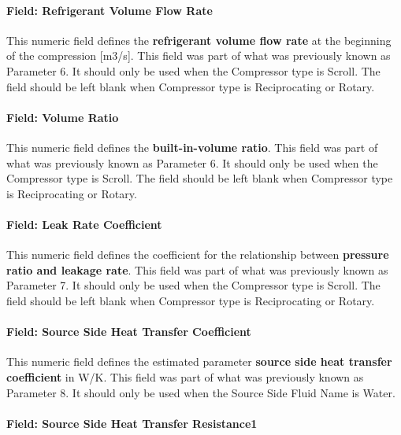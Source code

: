 \paragraph{Field: Refrigerant Volume Flow Rate}\label{field-refrigerant-volume-flow-rate-1}

This numeric field defines the \textbf{refrigerant volume flow rate} at the beginning of the compression {[}m3/s{]}. This field was part of what was previously known as Parameter 6. It should only be used when the Compressor type is Scroll. The field should be left blank when Compressor type is Reciprocating or Rotary.

\paragraph{Field: Volume Ratio}\label{field-volume-ratio-1}

This numeric field defines the \textbf{built-in-volume ratio}. This field was part of what was previously known as Parameter 6. It should only be used when the Compressor type is Scroll. The field should be left blank when Compressor type is Reciprocating or Rotary.

\paragraph{Field: Leak Rate Coefficient}\label{field-leak-rate-coefficient-1}

This numeric field defines the coefficient for the relationship between \textbf{pressure ratio and leakage rate}. This field was part of what was previously known as Parameter 7. It should only be used when the Compressor type is Scroll. The field should be left blank when Compressor type is Reciprocating or Rotary.

\paragraph{Field: Source Side Heat Transfer Coefficient}\label{field-source-side-heat-transfer-coefficient-1}

This numeric field defines the estimated parameter \textbf{source side heat transfer coefficient} in W/K. This field was part of what was previously known as Parameter 8. It should only be used when the Source Side Fluid Name is Water.

\paragraph{Field: Source Side Heat Transfer Resistance1}\label{field-source-side-heat-transfer-resistance1-1}

